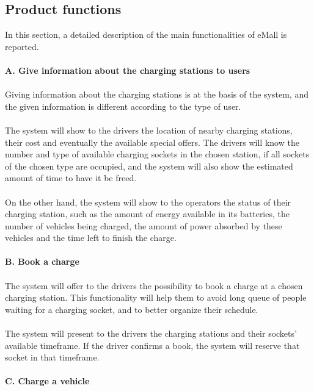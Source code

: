 \documentclass[../main.tex]{subfiles}
\begin{document}
\subsection{Product functions}
In this section, a detailed description of the main functionalities of eMall is reported.
\\
\\
\textbf{A. Give information about the charging stations to users}
\vspace{-0.7em}
\\
\\
Giving information about the charging stations is at the basis of the system, and the given information is different according to the type of user.
\\
\\
The system will show to the drivers the location of nearby charging stations, their cost and eventually the available special offers. The drivers will know the number and type of available charging sockets in the chosen station, if all sockets of the chosen type are occupied, and the system will also show the estimated amount of time to have it be freed. 
\\
\\
On the other hand, the system will show to the operators the status of their charging station, such as the amount of energy available in its batteries, the number of vehicles being charged, the amount of power absorbed by these vehicles and the time left to finish the charge.
\vspace{1.5em}
\\
\\
\textbf{B. Book a charge}
\vspace{-0.7em}
\\
\\
The system will offer to the drivers the possibility to book a charge at a chosen charging station. This functionality will help them to avoid long queue of people waiting for a charging socket, and to better organize their schedule. 
\\
\\
The system will present to the drivers the charging stations and their sockets’ available timeframe. If the driver confirms a book, the system will reserve that socket in that timeframe. 
\vspace{1.5em}
\\
\\
\textbf{C. Charge a vehicle}
\vspace{-0.7em}
\end{document}
